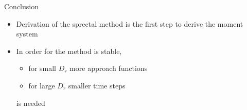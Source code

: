 \begin{comment}
\begin{frame}{Elongational flow: Stability analysis}
	\begin{columns}
		\begin{column}{0.5\textwidth}
			\begin{figure}
				\texttt{[image: Bilder/elongational\_l=1\_lsg\_ueber\_Zeit\_14th]}
				\caption{Coefficients as function of time}
			\end{figure}
		\end{column}
		\begin{column}{0.5\textwidth}
			\begin{figure}
				\texttt{[image: Bilder/Stability\_analysis\_14th\_dr0.1]}
				\caption{Eigenvalue of matrix $A$}
			\end{figure}
		\end{column}
	\end{columns}
	\centering
	With $14th.$ order and $D_r = 0.1$.
\end{frame}
\end{comment}


\begin{comment}
\begin{frame}{Elongational flow: Stability analysis}
	\begin{figure}
		\centering
		\begin{minipage}{0.4\linewidth}
			\texttt{[image: Bilder/Stability\_analysis\_2nd\_dr1]}
		\end{minipage}
		\hspace{1cm}
		\begin{minipage}{0.4\linewidth}
			\centering
			\texttt{[image: Bilder/Stability\_analysis\_2nd\_dr0.14]}
		\end{minipage}
		\caption{Eigenvalue of matrix $A$ with basis functions of $2nd.$ order}
	\end{figure}
	
	\begin{block}{Finding 1}
		The maximum value of eigenvalue of matrix $A$ with basis functions of $2nd.$ order is $0.01714 > 0$. It follows:
		Sprectal method for $2nd.$ order is unstable with $D_r < 0.15$.
	\end{block}
\end{frame}
\end{comment}


\begin{frame}{Conclusion}
		\begin{itemize}
			\item Derivation of the sprectal method is the first step to derive the moment system
			\item In order for the method is stable,
				\begin{itemize}
					\item for small $D_r$ more approach functions 
					\item for large $D_r$ smaller time steps 
				\end{itemize} 
			is needed
		\end{itemize}
\end{frame}


